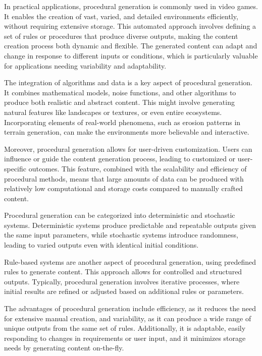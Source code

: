 In practical applications, procedural generation is commonly used in video games. It enables the creation of vast, varied, and detailed environments efficiently, without requiring extensive storage. This automated approach involves defining a set of rules or procedures that produce diverse outputs, making the content creation process both dynamic and flexible. The generated content can adapt and change in response to different inputs or conditions, which is particularly valuable for applications needing variability and adaptability.

The integration of algorithms and data is a key aspect of procedural generation. It combines mathematical models, noise functions, and other algorithms to produce both realistic and abstract content. This might involve generating natural features like landscapes or textures, or even entire ecosystems. Incorporating elements of real-world phenomena, such as erosion patterns in terrain generation, can make the environments more believable and interactive.

Moreover, procedural generation allows for user-driven customization. Users can influence or guide the content generation process, leading to customized or user-specific outcomes. This feature, combined with the scalability and efficiency of procedural methods, means that large amounts of data can be produced with relatively low computational and storage costs compared to manually crafted content.

Procedural generation can be categorized into deterministic and stochastic systems. Deterministic systems produce predictable and repeatable outputs given the same input parameters, while stochastic systems introduce randomness, leading to varied outputs even with identical initial conditions.

Rule-based systems are another aspect of procedural generation, using predefined rules to generate content. This approach allows for controlled and structured outputs. Typically, procedural generation involves iterative processes, where initial results are refined or adjusted based on additional rules or parameters.

The advantages of procedural generation include efficiency, as it reduces the need for extensive manual creation, and variability, as it can produce a wide range of unique outputs from the same set of rules. Additionally, it is adaptable, easily responding to changes in requirements or user input, and it minimizes storage needs by generating content on-the-fly.

